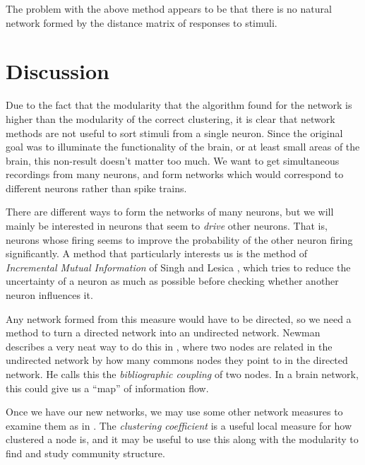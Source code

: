 The problem with the above method appears to be that there is no natural network formed by the distance matrix of responses to stimuli.






\section{Discussion}
Due to the fact that the modularity that the algorithm found for the network is 
higher than the modularity of the correct clustering, it is clear that network 
methods are not useful to sort stimuli from a single neuron.  Since the 
original goal was to illuminate the functionality of the brain, or at least 
small areas of the brain, this non-result doesn't matter too much.  We want to 
get simultaneous recordings from many neurons, and form networks which would 
correspond to different neurons rather than spike trains.

There are different ways to form the networks of many neurons, but we will 
mainly be interested in neurons that seem to {\sl drive} other neurons.  That 
is, neurons whose firing seems to improve the probability of the other neuron 
firing significantly.  A method that particularly interests us is the method of 
{\sl Incremental Mutual Information} of Singh and Lesica 
\cite{SinghLesica2010a}, which tries to reduce the uncertainty of a neuron as 
much as possible before checking whether another neuron influences it.

Any network formed from this measure would have to be directed, so we need a 
method to turn a directed network into an undirected network.  Newman describes 
a very neat way to do this in \cite{Newman2010a}, where two nodes are related 
in the undirected network by how many commons nodes they point to in the 
directed network.  He calls this the {\sl bibliographic coupling} of two 
nodes.  In a brain network, this could give us a ``map'' of information flow.

Once we have our new networks, we may use some other network measures to 
examine them as in \cite{RubinovSporns2010a}.  The {\sl clustering coefficient} 
is a useful local measure for how clustered a node is, and it may be useful to 
use this along with the modularity to find and study community structure.



